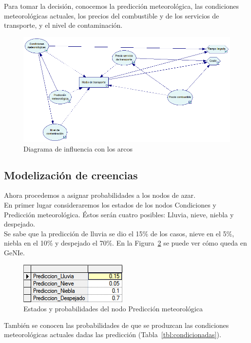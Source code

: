 \documentclass[12pt,a4paper,twoside,openright,titlepage,final]{article}
\begin{document}
Para tomar la decisión, conocemos la predicción meteorológica, las condiciones meteorológicas actuales, los precios del combustible y de los servicios de transporte, y el nivel de contaminación.

\begin{figure}[tbph!]
	\centering
	\includegraphics[width=0.9\linewidth]{imagenes/diagrama_2}
	\caption{Diagrama de influencia con los arcos}
	\label{fig:diagrama_2}
\end{figure}

\subsection{Modelización de creencias}

Ahora procedemos a asignar probabilidades a los nodos de azar.\\

En primer lugar consideraremos los estados de los nodos Condiciones y Predicción meteorológica. Éstos serán cuatro posibles: Lluvia, nieve, niebla y despejado.\\

Se sabe que la predicción de lluvia se dio el 15\% de los casos, nieve en el 5\%, niebla en el 10\% y despejado el 70\%. En la Figura~\ref{fig:prob_pred_met} se puede ver cómo queda en GeNIe.\\   

\begin{figure}[tbph!]
	\centering
	\includegraphics[width=0.3\linewidth]{imagenes/prob_pred_met}
	\caption{Estados y probabilidades del nodo Predicción meteorológica}
	\label{fig:prob_pred_met}
\end{figure}

También se conocen las probabilidades de que se produzcan las condiciones meteorológicas actuales dadas las predicción (Tabla~\ref{tbl:condicionadas}).
\end{document}

